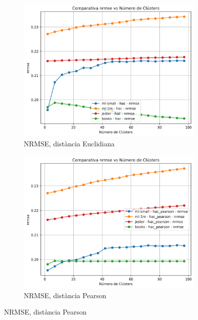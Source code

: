 \documentclass[a4paper,12pt]{report}
\begin{document}
\begin{figure}[H]
    \vspace{1em}

    \begin{subfigure}[b]{0.49\textwidth}
        \includegraphics[width=\textwidth]{Figuras/nrmse-hac-all.png}
        \caption{NRMSE, distància Euclidiana}
        \label{fig:hac-clustering-results-c}
    \end{subfigure}
    \hfill
    \begin{subfigure}[b]{0.49\textwidth}
        \includegraphics[width=\textwidth]{Figuras/nrmse-hac_pearson-all.png}
        \caption{NRMSE, distància Pearson}
        \label{fig:hac-clustering-results-d}
    \end{subfigure}


\end{figure}
\end{document}
